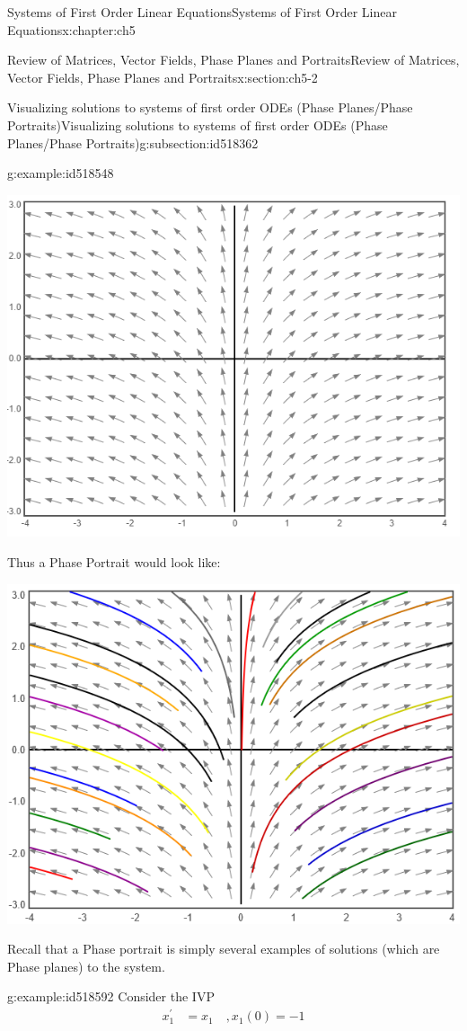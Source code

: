 \documentclass[oneside,10pt,]{book}
\numberwithin{equation}{section}
\numberwithin{equation}{section}
\newcommand{\amp}{&}
\begin{document}
\begin{chapterptx}{Systems of First Order Linear Equations}{}{Systems of First Order Linear Equations}{}{}{x:chapter:ch5}
\begin{sectionptx}{Review of Matrices, Vector Fields, Phase Planes and Portraits}{}{Review of Matrices, Vector Fields, Phase Planes and Portraits}{}{}{x:section:ch5-2}
\begin{subsectionptx}{Visualizing solutions to systems of first order ODEs (Phase Planes\slash{}Phase Portraits)}{}{Visualizing solutions to systems of first order ODEs (Phase Planes\slash{}Phase Portraits)}{}{}{g:subsection:id518362}
\begin{example}{}{g:example:id518548}
\begin{image}{0}{1}{0}
\includegraphics[width=\linewidth]{images/5-VecField1.png}
\end{image}%
 Thus a Phase Portrait would look like: \begin{image}{0}{1}{0}%
\includegraphics[width=\linewidth]{images/5-VecField1b.png}
\end{image}%
 Recall that a Phase portrait is simply several examples of solutions (which are Phase planes) to the system.%
\end{example}
\begin{example}{}{g:example:id518592}%
Consider the IVP%
\begin{align*}
x_{1}^{\prime} \amp =x_{1}\,\,\,\,\,\,,x_{1}(0)=-1\\

\end{align*}
\end{example}
\end{subsectionptx}
\end{sectionptx}
\end{chapterptx}
\end{document}

